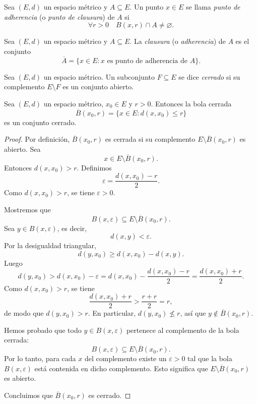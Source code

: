 \begin{defi}
Sea $(E,d)$ un espacio métrico y $A \subseteq E$.
Un punto $x \in E$ se llama \emph{punto de adherencia} (o
\emph{punto de clausura}) de $A$ si
\[
\forall r > 0 \quad B(x,r) \cap A \ne \varnothing.
\]
\end{defi}

\begin{defi}
Sea $(E,d)$ un espacio métrico y $A \subseteq E$.
La \emph{clausura} (o \emph{adherencia}) de $A$ es el conjunto
\[
\overline{A}
= \{x \in E : x \text{ es punto de adherencia de } A\}.
\]
\end{defi}

\begin{defi}
Sea $(E,d)$ un espacio métrico. Un subconjunto $F \subseteq E$ se dice
\emph{cerrado} si su complemento $E \setminus F$ es un conjunto abierto.
\end{defi}

\begin{prop}
Sea $(E,d)$ un espacio métrico, $x_0 \in E$ y $r>0$.
Entonces la bola cerrada
\[
\overline{B}(x_0,r) = \{x \in E : d(x,x_0) \le r\}
\]
es un conjunto cerrado.
\end{prop}

\begin{proof}
Por definición, $\overline{B}(x_0,r)$ es cerrada si su complemento
$E \setminus \overline{B}(x_0,r)$ es abierto. Sea
\[
x \in E \setminus \overline{B}(x_0,r).
\]
Entonces $d(x,x_0) > r$. Definimos
\[
\varepsilon = \frac{d(x,x_0) - r}{2}.
\]
Como $d(x,x_0) > r$, se tiene $\varepsilon > 0$.

Mostremos que
\[
B(x,\varepsilon) \subseteq E \setminus \overline{B}(x_0,r).
\]
Sea $y \in B(x,\varepsilon)$, es decir,
\[
d(x,y) < \varepsilon.
\]
Por la desigualdad triangular,
\[
d(y,x_0) \ge d(x,x_0) - d(x,y).
\]
Luego
\[
d(y,x_0) > d(x,x_0) - \varepsilon
= d(x,x_0) - \frac{d(x,x_0) - r}{2}
= \frac{d(x,x_0) + r}{2}.
\]
Como $d(x,x_0) > r$, se tiene
\[
\frac{d(x,x_0) + r}{2} > \frac{r + r}{2} = r,
\]
de modo que $d(y,x_0) > r$. En particular, $d(y,x_0) \not\le r$, así que
$y \notin \overline{B}(x_0,r)$.

Hemos probado que todo $y \in B(x,\varepsilon)$ pertenece al complemento
de la bola cerrada:
\[
B(x,\varepsilon) \subseteq E \setminus \overline{B}(x_0,r).
\]
Por lo tanto, para cada $x$ del complemento existe un $\varepsilon>0$
tal que la bola $B(x,\varepsilon)$ está contenida en dicho complemento.
Esto significa que $E \setminus \overline{B}(x_0,r)$ es abierto.

Concluimos que $\overline{B}(x_0,r)$ es cerrado.
\end{proof}


